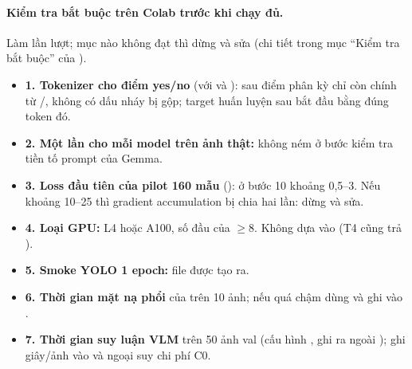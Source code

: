 \paragraph{Kiểm tra bắt buộc trên Colab trước khi chạy đủ.} Làm lần lượt; mục nào không đạt thì dừng và sửa
(chi tiết trong mục ``Kiểm tra bắt buộc'' của ).
\begin{itemize}[label=$\square$]
  \item \textbf{1. Tokenizer cho điểm yes/no} (với  và ): sau điểm phân kỳ chỉ còn chính
        từ /, không có dấu nháy bị gộp; target huấn luyện sau  bắt đầu bằng
        đúng token đó.
  \item \textbf{2. Một lần  cho mỗi model trên ảnh thật:} không ném  ở bước
        kiểm tra tiền tố prompt của Gemma.
  \item \textbf{3. Loss đầu tiên của pilot 160 mẫu} ():  ở bước 10
        khoảng 0,5--3. Nếu khoảng 10--25 thì gradient accumulation bị chia hai lần: dừng và sửa.
  \item \textbf{4. Loại GPU:} L4 hoặc A100, số đầu của  $\ge 8$. Không
        dựa vào  (T4 cũng trả ).
  \item \textbf{5. Smoke YOLO 1 epoch:} file  được tạo ra.
  \item \textbf{6. Thời gian mặt nạ phổi} của  trên 10 ảnh; nếu quá chậm dùng
         và ghi vào .
  \item \textbf{7. Thời gian suy luận VLM} trên 50 ảnh val (cấu hình , ghi ra ngoài );
        ghi giây/ảnh vào  và ngoại suy chi phí C0.
\end{itemize}


